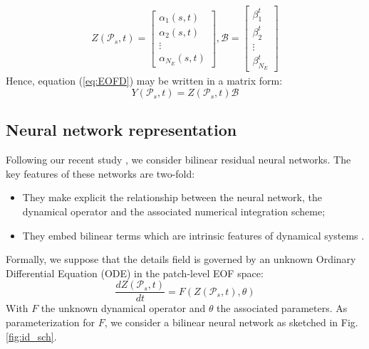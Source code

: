 \documentclass{article}
\begin{document}
\begin{align}
	Z(\mathcal{P}_s,t) = \begin{bmatrix}
           \alpha_1(s,t) \\
           \alpha_2(s,t) \\
           \vdots \\
           \alpha_{N_E}(s,t)
         \end{bmatrix}
         ,
	\mathcal{B} = \begin{bmatrix}
           \beta_1^t \\
           \beta_2^t \\
           \vdots \\
           \beta_{N_E}^t
         \end{bmatrix}         
  \end{align}
Hence, equation (\ref{eq:EOFD}) may be written in a matrix form:
\begin{equation}
Y(\mathcal{P}_s,t)= Z(\mathcal{P}_s,t)\mathcal{B}
\label{eq:EOFDM}
\end{equation}

\subsection{Neural network representation}

Following our recent study \cite{fablet_bilinear_2017}, we consider bilinear residual neural networks. The key features of these networks are two-fold:
\begin{itemize}[topsep=0pt]
\itemsep0em 
\item They make explicit the relationship between the neural network, the dynamical operator and the associated numerical integration scheme;
\item They embed bilinear terms which are intrinsic features of dynamical systems \cite{brunton_discovering_2016}.
\end{itemize}
Formally, we suppose that the details field is governed by an unknown Ordinary Differential Equation (ODE) in the patch-level EOF space:
\begin{equation}
\frac{dZ(\mathcal{P}_s,t)}{dt}= F\left ( Z(\mathcal{P}_s,t), \theta \right )
\label{eq:sys dyn}
\end{equation}
With $F$ the unknown dynamical operator and $\theta$ the associated parameters. As parameterization for $F$, we consider a bilinear neural network as sketched in Fig.\ref{fig:id_sch}.  
\end{document}
